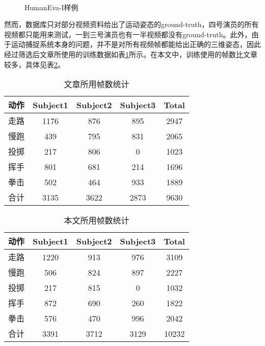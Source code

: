 \begin{figure}[htbp]
  \centering
  \hspace{.5cm}
  \\
  \hspace{.5cm}
  \caption{HumanEva-I样例}\label{fig:demo}
\end{figure}

然而，数据库只对部分视频资料给出了运动姿态的ground-truth，四号演员的所有视频都只能用来测试，一到三号演员也有一半视频都没有ground-truth。此外，由于运动捕捉系统本身的问题，并不是对所有视频帧都能给出正确的三维姿态，因此经过筛选后\cite{Poppe2007}\cite{bo2010twin}文章所使用的训练数据如表\ref{tab:poppe}所示。在本文中，训练使用的帧数比\cite{Poppe2007}\cite{bo2010twin}文章较多，具体见表\ref{tab:mydataset}。

\begin{table}[htbp]
  \centering
  \caption{\cite{Poppe2007}\cite{bo2010twin}文章所用帧数统计}
  \label{tab:poppe}
    \begin{tabular}{lcccc}
      \toprule[1.5pt]
      动作 & Subject1 & Subject2 & Subject3 & Total \\\midrule[1pt]
      走路 & 1176 & 876 & 895 & 2947 \\
      慢跑 & 439 & 795 & 831 & 2065 \\
      投掷 & 217 & 806 & 0 & 1023\\
      挥手 & 801 & 681 & 214 & 1696\\
      拳击 & 502 & 464 & 933 & 1889\\
      合计 & 3135 & 3622 & 2873 & 9630\\
      \bottomrule[1.5pt]
    \end{tabular}
\end{table}

\begin{table}[htbp]
  \centering
  \caption{本文所用帧数统计}
  \label{tab:mydataset}
    \begin{tabular}{lcccc}
      \toprule[1.5pt]
      动作 & Subject1 & Subject2 & Subject3 & Total \\\midrule[1pt]
      走路 & 1220 & 913 & 976 & 3109 \\
      慢跑 & 506 & 824 & 897 & 2227 \\
      投掷 & 217 & 815 & 0 & 1032\\
      挥手 & 872 & 690 & 260 & 1822\\
      拳击 & 576 & 470 & 996 & 2042\\
      合计 & 3391 & 3712 & 3129 & 10232\\
      \bottomrule[1.5pt]
    \end{tabular}
\end{table}



